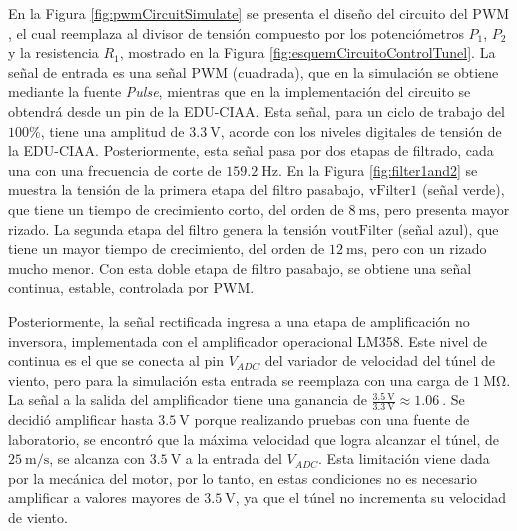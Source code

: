 En la Figura \ref{fig:pwmCircuitSimulate} se presenta el diseño del circuito del PWM \cite{EEVblog225}, el cual reemplaza al divisor de tensión compuesto por los potenciómetros $P_{1}$, $P_{2}$ y la resistencia $R_{1}$, mostrado en la Figura \ref{fig:esquemCircuitoControlTunel}. La señal de entrada es una señal PWM (cuadrada), que en la simulación se obtiene mediante la fuente \textit{Pulse}, mientras que en la implementación del circuito se obtendrá desde un pin de la EDU-CIAA. Esta señal, para un ciclo de trabajo del $100\%$, tiene una amplitud de $\SI{3.3}{\volt}$, acorde con los niveles digitales de tensión de la EDU-CIAA. Posteriormente, esta señal pasa por dos etapas de filtrado, cada una con una frecuencia de corte de $\SI{159.2}{\hertz}$. En la Figura \ref{fig:filter1and2} se muestra la tensión de la primera etapa del filtro pasabajo, $\text{vFilter1}$ (señal verde), que tiene un tiempo de crecimiento corto, del orden de $\SI{8}{\milli\second}$, pero presenta mayor rizado. La segunda etapa del filtro genera la tensión $\text{voutFilter}$ (señal azul), que tiene un mayor tiempo de crecimiento, del orden de $\SI{12}{\milli\second}$, pero con un rizado mucho menor. Con esta doble etapa de filtro pasabajo, se obtiene una señal continua, estable, controlada por PWM.


Posteriormente, la señal rectificada ingresa a una etapa de amplificación no inversora, implementada con el amplificador operacional LM358. Este nivel de continua es el que se conecta al pin $V_{ADC}$ del variador de velocidad del túnel de viento, pero para la simulación esta entrada se reemplaza con una carga de $\SI{1}{\mega\ohm}$. La señal a la salida del amplificador tiene una ganancia de $ \frac{\SI{3.5}{\volt}}{\SI{3.3}{\volt}} \approx \SI{1.06}{}$. Se decidió amplificar hasta $\SI{3.5}{\volt}$ porque realizando pruebas con una fuente de laboratorio, se encontró que la máxima velocidad que logra alcanzar el túnel, de $\SI{25}{\meter\per\second}$, se alcanza con $\SI{3.5}{\volt}$ a la entrada del $V_{ADC}$. Esta limitación viene dada por la mecánica del motor, por lo tanto, en estas condiciones no es necesario amplificar a valores mayores de $\SI{3.5}{\volt}$, ya que el túnel no incrementa su velocidad de viento.



